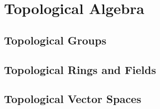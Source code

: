 \section{Topological Algebra} 

\subsection{Topological Groups}

\subsection{Topological Rings and Fields}

\subsection{Topological Vector Spaces}

